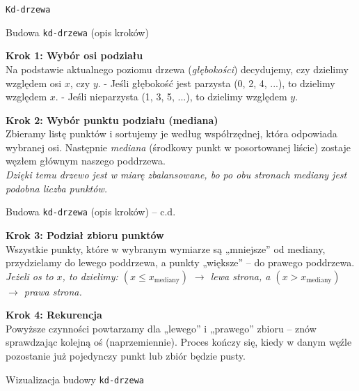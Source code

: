 \documentclass[aspectratio=1610, polish]{beamer}
\begin{document}
\begin{section}{\texttt{Kd-drzewa}}
\begin{frame}
    \end{frame}

\begin{frame}{Budowa \texttt{kd-drzewa} (opis kroków)}

\begin{mdframed}
\textbf{Krok 1: Wybór osi podziału}\\[3pt]
Na podstawie aktualnego poziomu drzewa (\textit{głębokości}) decydujemy, czy dzielimy względem osi \(x\), czy \(y\).
- Jeśli głębokość jest parzysta (0, 2, 4, ...), to dzielimy względem \(x\).
- Jeśli nieparzysta (1, 3, 5, ...), to dzielimy względem \(y\).
\end{mdframed}

\begin{mdframed}
\textbf{Krok 2: Wybór punktu podziału (mediana)}\\[3pt]
Zbieramy listę punktów i sortujemy je według współrzędnej, która odpowiada wybranej osi.
Następnie \textit{mediana} (środkowy punkt w posortowanej liście) zostaje węzłem głównym
naszego poddrzewa. \\
\textit{Dzięki temu drzewo jest w miarę zbalansowane, bo po obu stronach mediany jest podobna liczba punktów.}
\end{mdframed}

    
\end{frame}

\begin{frame}{Budowa \texttt{kd-drzewa} (opis kroków) -- c.d.}
\begin{mdframed}
\textbf{Krok 3: Podział zbioru punktów} \\[3pt]
Wszystkie punkty, które w wybranym wymiarze są „mniejsze” od mediany,
przydzielamy do lewego poddrzewa, a punkty „większe” – do prawego poddrzewa.  
\textit{Jeżeli os to \(x\), to dzielimy: \((x \leq x_{\text{mediany}})\) \(\to\) lewa strona, a \((x > x_{\text{mediany}})\) \(\to\) prawa strona.}
\end{mdframed}

\begin{mdframed}
\textbf{Krok 4: Rekurencja} \\[3pt]
Powyższe czynności powtarzamy dla „lewego” i „prawego” zbioru – znów sprawdzając kolejną
oś (naprzemiennie). Proces kończy się, kiedy w danym węźle
pozostanie już pojedynczy punkt lub zbiór będzie pusty.
\end{mdframed}

\end{frame}

\begin{frame}{Wizualizacja budowy \texttt{kd-drzewa}}
    \centering
\end{frame}


\end{section}
\end{document}
